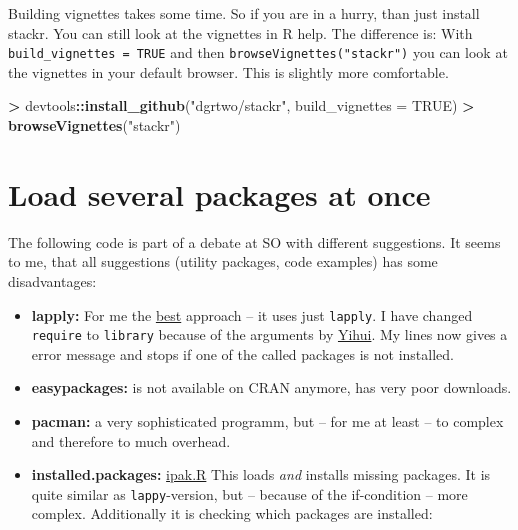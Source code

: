 \documentclass[]{book}
\newenvironment{Shaded}{\begin{snugshade}}{\end{snugshade}}
\newcommand{\KeywordTok}[1]{\textcolor[rgb]{0.13,0.29,0.53}{\textbf{#1}}}
\newcommand{\DataTypeTok}[1]{\textcolor[rgb]{0.13,0.29,0.53}{#1}}
\newcommand{\StringTok}[1]{\textcolor[rgb]{0.31,0.60,0.02}{#1}}
\newcommand{\OtherTok}[1]{\textcolor[rgb]{0.56,0.35,0.01}{#1}}
\newcommand{\OperatorTok}[1]{\textcolor[rgb]{0.81,0.36,0.00}{\textbf{#1}}}
\newcommand{\NormalTok}[1]{#1}
\providecommand{\tightlist}{%
  \setlength{\itemsep}{0pt}\setlength{\parskip}{0pt}}
\theoremstyle{definition}
\theoremstyle{definition}
\theoremstyle{definition}
\theoremstyle{remark}
\begin{document}
Building vignettes takes some time. So if you are in a hurry, than just
install stackr. You can still look at the vignettes in R help. The
difference is: With \texttt{build\_vignettes\ =\ TRUE} and then
\texttt{browseVignettes("stackr")} you can look at the vignettes in your
default browser. This is slightly more comfortable.

\begin{Shaded}
\begin{Highlighting}[]
\OperatorTok{>}\StringTok{ }\NormalTok{devtools}\OperatorTok{::}\KeywordTok{install_github}\NormalTok{(}\StringTok{"dgrtwo/stackr"}\NormalTok{, }\DataTypeTok{build_vignettes =} \OtherTok{TRUE}\NormalTok{)}
\OperatorTok{>}\StringTok{ }\KeywordTok{browseVignettes}\NormalTok{(}\StringTok{"stackr"}\NormalTok{)}
\end{Highlighting}
\end{Shaded}

\section{Load several packages at
once}\label{load-several-packages-at-once}

The following code is part of a debate at SO with different suggestions.
It seems to me, that all suggestions (utility packages, code examples)
has some disadvantages:

\begin{itemize}
\tightlist
\item
  \textbf{lapply:} For me the
  \href{https://stackoverflow.com/questions/8175912/load-multiple-packages-at-once}{best}
  approach -- it uses just \texttt{lapply}. I have changed
  \texttt{require} to \texttt{library} because of the arguments by
  \href{https://yihui.name/en/2014/07/library-vs-require/}{Yihui}. My
  lines now gives a error message and stops if one of the called
  packages is not installed.
\item
  \textbf{easypackages:} is not available on CRAN anymore, has very poor
  downloads.
\item
  \textbf{pacman:} a very sophisticated programm, but -- for me at least
  -- to complex and therefore to much overhead.
\item
  \textbf{installed.packages:}
  \href{https://gist.github.com/stevenworthington/3178163}{ipak.R} This
  loads \emph{and} installs missing packages. It is quite similar as
  \texttt{lappy}-version, but -- because of the if-condition -- more
  complex. Additionally it is checking which packages are installed:
\end{itemize}
\end{document}
